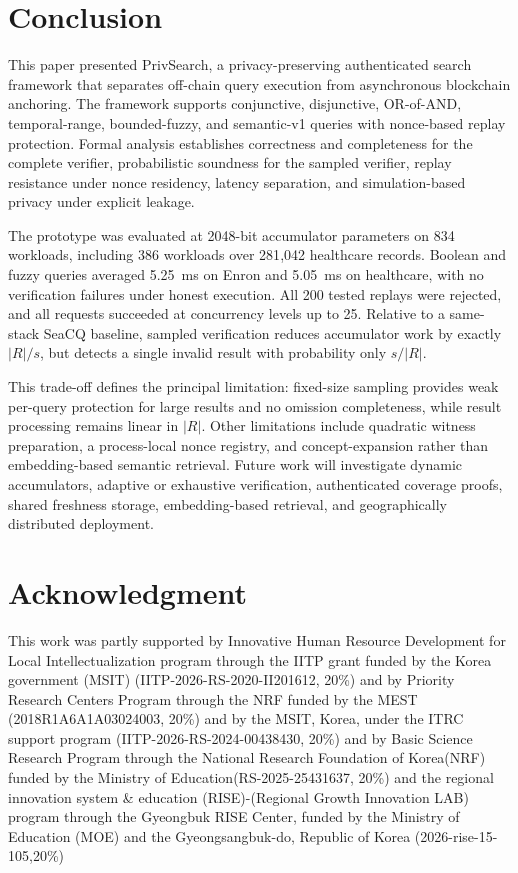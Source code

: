 \documentclass[journal]{IEEEtran}
\theoremstyle{tight}
\theoremstyle{remark}
\theoremstyle{plain}
\begin{document}
\section{Conclusion}
\label{sec:conclusion}

This paper presented PrivSearch, a privacy-preserving authenticated search framework that separates off-chain query execution from asynchronous blockchain anchoring. The framework supports conjunctive, disjunctive, OR-of-AND, temporal-range, bounded-fuzzy, and semantic-v1 queries with nonce-based replay protection. Formal analysis establishes correctness and completeness for the complete verifier, probabilistic soundness for the sampled verifier, replay resistance under nonce residency, latency separation, and simulation-based privacy under explicit leakage.

The prototype was evaluated at 2048-bit accumulator parameters on 834 workloads, including 386 workloads over 281{,}042 healthcare records. Boolean and fuzzy queries averaged 5.25~ms on Enron and 5.05~ms on healthcare, with no verification failures under honest execution. All 200 tested replays were rejected, and all requests succeeded at concurrency levels up to 25. Relative to a same-stack SeaCQ baseline, sampled verification reduces accumulator work by exactly \( |R|/s \), but detects a single invalid result with probability only \(s/|R|\).

This trade-off defines the principal limitation: fixed-size sampling provides weak per-query protection for large results and no omission completeness, while result processing remains linear in \(|R|\). Other limitations include quadratic witness preparation, a process-local nonce registry, and concept-expansion rather than embedding-based semantic retrieval. Future work will investigate dynamic accumulators, adaptive or exhaustive verification, authenticated coverage proofs, shared freshness storage, embedding-based retrieval, and geographically distributed deployment.
 
 
\section*{Acknowledgment}
\footnotesize This work was partly supported by Innovative Human Resource Development for Local Intellectualization program through the IITP grant funded by the Korea government (MSIT) (IITP-2026-RS-2020-II201612, 20\%) and by Priority Research Centers Program through the NRF funded by the MEST (2018R1A6A1A03024003, 20\%) and by the MSIT, Korea, under the ITRC support program (IITP-2026-RS-2024-00438430, 20\%) and by Basic Science Research Program through the National Research Foundation of Korea(NRF) funded by the Ministry of Education(RS-2025-25431637, 20\%) and the regional innovation system \& education (RISE)-(Regional Growth Innovation LAB) program through the Gyeongbuk RISE Center, funded by the Ministry of Education (MOE) and the Gyeongsangbuk-do, Republic of Korea (2026-rise-15-105,20\%)
 
 
\balance
 


 
\end{document}
